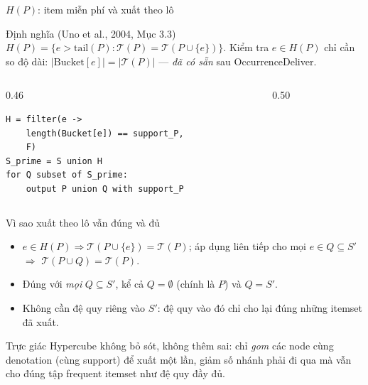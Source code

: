 \documentclass[9pt, aspectratio=169]{beamer}
\begin{document}
\begin{frame}[fragile]{$H(P)$: item miễn phí và xuất theo lô}
  \begin{block}{Định nghĩa (Uno et al., 2004, Mục 3.3)}
    \small $H(P)=\{e>\mathrm{tail}(P): \mathcal T(P)=\mathcal T(P\cup\{e\})\}$.
    Kiểm tra $e\in H(P)$ chỉ cần so độ dài: $|\mathrm{Bucket}[e]|=|\mathcal T(P)|$
    — \emph{đã có sẵn} sau OccurrenceDeliver.
  \end{block}

  \begin{columns}[T,onlytextwidth]
    \begin{column}{0.46\textwidth}
\begin{lstlisting}
H = filter(e ->
    length(Bucket[e]) == support_P,
    F)
S_prime = S union H
for Q subset of S_prime:
    output P union Q with support_P
\end{lstlisting}
    \end{column}
    \begin{column}{0.50\textwidth}
      \centering
    \end{column}
  \end{columns}

  \vspace{0.4em}
\end{frame}

\begin{frame}{Vì sao xuất theo lô vẫn đúng và đủ}
  \begin{itemize}
    \item $e\in H(P)\Rightarrow\mathcal T(P\cup\{e\})=\mathcal T(P)$; áp dụng
      liên tiếp cho mọi $e\in Q\subseteq S'$ $\Rightarrow$
      $\mathcal T(P\cup Q)=\mathcal T(P)$.
    \item Đúng với \emph{mọi} $Q\subseteq S'$, kể cả $Q=\emptyset$ (chính là
      $P$) và $Q=S'$.
    \item Không cần đệ quy riêng vào $S'$: đệ quy vào đó chỉ cho lại đúng
      những itemset đã xuất.
  \end{itemize}
  \begin{alertblock}{Trực giác}
    Hypercube không bỏ sót, không thêm sai: chỉ \emph{gom} các node cùng
    denotation (cùng support) để xuất một lần, giảm số nhánh phải đi qua mà
    vẫn cho đúng tập frequent itemset như đệ quy đầy đủ.
  \end{alertblock}
\end{frame}
\end{document}
